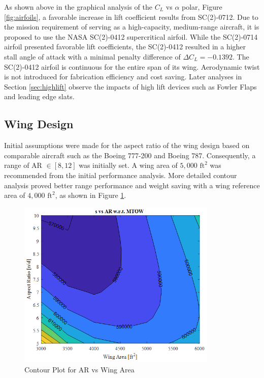 As shown above in the graphical analysis of the $C_L$ vs $\alpha$ polar, Figure \ref{fig:airfoils}, a favorable increase in lift coefficient results from SC(2)-0712.  Due to the mission requirement of serving as a high-capacity, medium-range aircraft, it is proposed to use the NASA SC(2)-0412 supercritical airfoil.  While the SC(2)-0714 airfoil presented favorable lift coefficients, the SC(2)-0412 resulted in a higher stall angle of attack with a minimal penalty difference of $\Delta C_L = -0.1392$.  The SC(2)-0412 airfoil is continuous for the entire span of its wing.  Aerodynamic twist is not introduced for fabrication efficiency and cost saving.  Later analyses in Section \ref{sec:highlift} observe the impacts of high lift devices such as Fowler Flaps and leading edge slats.


\newpage
\subsection{Wing Design}
Initial assumptions were made for the aspect ratio of the wing design based on comparable aircraft such as the Boeing 777-200 and Boeing 787.  Consequently, a range of AR $ \in [8,12]$ was initially set.  A wing area of $5,000 \text{ ft}^2$ was recommended from the initial performance analysis.  More detailed contour analysis proved better range performance and weight saving with a wing reference area of $4,000 \text{ ft}^2$, as shown in Figure \ref{fig:contourf}.

\begin{figure}[!h]
    \centering
    \includegraphics[width=0.85\textwidth]{Photos/aero/ARWingcontourf.png}
    \caption{Contour Plot for AR vs Wing Area}
    \label{fig:contourf}
\end{figure}

